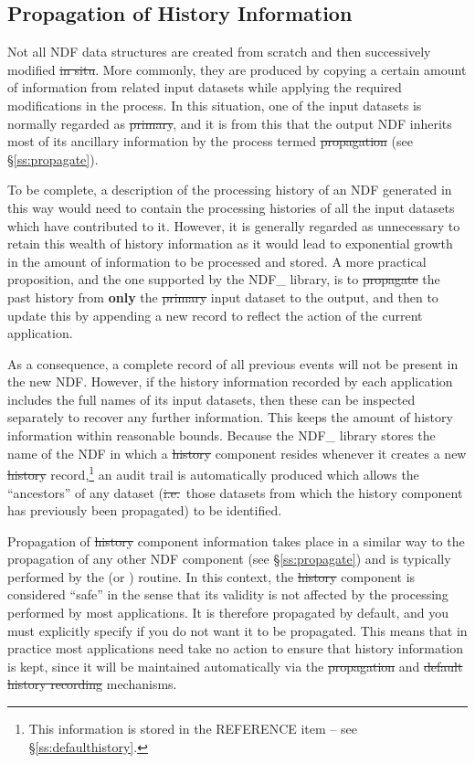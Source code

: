 \subsection{Propagation of History Information}

Not all NDF data structures are created from scratch and then
successively modified \st{in situ}. More commonly, they are produced
by copying a certain amount of information from related input datasets
while applying the required modifications in the process.  In this
situation, one of the input datasets is normally regarded as
\st{primary\/}, and it is from this that the output NDF inherits most
of its 
ancillary information by the process termed \st{propagation\/} (see
\S\ref{ss:propagate}).

To be complete, a description of the processing history of an NDF
generated in this way would need to contain the processing histories
of all the input datasets which have contributed to it. However, it is
generally regarded as unnecessary to retain this wealth of history
information as it would lead to exponential growth in the amount of
information to be processed and stored.  A more practical proposition,
and the one supported by the NDF\_ library, is to \st{propagate\/} the
past history from {\bf only} the \st{primary\/} input dataset to the
output, and then to update this by appending a new record to reflect
the action of the current application.

As a consequence, a complete record of all previous events will not be
present in the new NDF. However, if the history information recorded
by each application includes the full names of its input datasets,
then these can be inspected separately to recover any further
information. This keeps the amount of history information within
reasonable bounds.  Because the NDF\_ library stores the name of the
NDF in which a \st{history\/} component resides whenever it creates a
new \st{history\/} record,\footnote{This information is stored in the
REFERENCE item -- see \S\ref{ss:defaulthistory}.} an audit trail is
automatically produced which allows the ``ancestors'' of any dataset
(\st{i.e.}\ those datasets from which the history component has
previously been propagated) to be identified.

Propagation of \st{history\/} component information takes place in a
similar way to the propagation of any other NDF component (see
\S\ref{ss:propagate}) and is typically performed by the  (or
) routine. In this context, the \st{history\/} component is
considered ``safe'' in the sense that its validity is not affected by
the processing performed by most applications. It is therefore
propagated by default, and you must explicitly specify if you do not
want it to be propagated. This means that in practice most
applications need take no action to ensure that history information is
kept, since it will be maintained automatically via the
\st{propagation\/} and \st{default history recording\/} mechanisms. 

